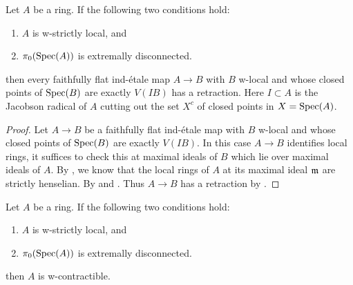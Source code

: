 \begin{lemma}
  \label{thm:ind-etale-plus-c-has-retraction-if}
  Let $A$ be a ring. If the following two conditions hold:
  \begin{enumerate}
    \item $A$ is w-strictly local, and \label{item:w-strictly-local-ind-etale-plus-c-has-retraction-if}
    \item $\pi_0(\operatorname{Spec} (A))$ is extremally disconnected. \label{item:extremally-disconnected-ind-etale-plus-c-has-retraction-if}
  \end{enumerate}
  then every faithfully flat ind-étale map \(A \to B\) with \(B\) w-local and whose closed points of \(\operatorname{Spec} (B)\) are exactly \(V(IB)\) has a retraction. Here $I \subset A$ is the Jacobson radical of $A$ cutting out the set $X^c$ of closed points in $X = \operatorname{Spec} (A)$.
\end{lemma}

\begin{proof}
  Let \(A \to B\) be a faithfully flat ind-étale map with \(B\) w-local and whose closed points of \(\operatorname{Spec} (B)\) are exactly \(V(IB)\). In this case $A \to B$ identifies local rings, it suffices to check this at maximal ideals of $B$ which lie over maximal ideals of $A$. By , we know that the local rings of $A$ at its maximal ideal $\mathfrak{m}$ are strictly henselian. By  and .
  Thus $A \to B$ has a retraction by .
\end{proof}

\begin{proposition} %
  \label{thm:w-contractible-if}
  Let $A$ be a ring. If the following two conditions hold:
  \begin{enumerate}
    \item $A$ is w-strictly local, and
    \item $\pi_0(\operatorname{Spec} (A))$ is extremally disconnected.
  \end{enumerate}
  then $A$ is w-contractible.
\end{proposition}

